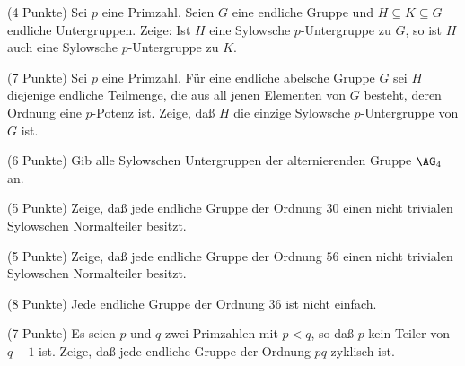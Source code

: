 \documentclass{algsheet}
\author{Dipl.-Math.~Franz Vogler}
\date{23.~Mai 2011}
\begin{document}
                \maketitle





\begin{exercise}(4 Punkte)\newline
    Sei \(p\) eine Primzahl.
    Seien \(G\) eine endliche Gruppe und \(H \subseteq K \subseteq G\) endliche
    Untergruppen. Zeige: Ist \(H\) eine Sylowsche \(p\)-Untergruppe zu \(G\), so
    ist \(H\) auch eine Sylowsche \(p\)-Untergruppe zu \(K\).
\end{exercise}

\begin{exercise}(7 Punkte)\newline
    Sei \(p\) eine Primzahl. Für eine endliche abelsche Gruppe \(G\) sei \(H\) diejenige
    endliche Teilmenge, die aus all jenen Elementen von \(G\) besteht, deren
    Ordnung eine \(p\)-Potenz ist. Zeige, daß \(H\) die einzige Sylowsche
    \(p\)-Untergruppe von \(G\) ist.
\end{exercise}

\begin{exercise}(6 Punkte)\newline
    Gib alle Sylowschen Untergruppen der alternierenden Gruppe \(\AG_4\) an.
\end{exercise}

\begin{exercise}(5 Punkte)\newline
    Zeige, daß jede endliche Gruppe der Ordnung \(30\) einen nicht trivialen
    Sylowschen Normalteiler besitzt.
\end{exercise}

\begin{exercise}(5 Punkte)\newline
    Zeige, daß jede endliche Gruppe der Ordnung \(56\) einen nicht trivialen
    Sylowschen Normalteiler besitzt.
\end{exercise}

\begin{exercise}(8 Punkte)\newline
    Jede endliche Gruppe der Ordnung \(36\) ist nicht einfach.
\end{exercise}

\begin{exercise}(7 Punkte)\newline
    Es seien \(p\) und \(q\) zwei Primzahlen mit \(p < q\), so daß \(p\) kein
    Teiler von \(q - 1\) ist. Zeige, daß jede endliche Gruppe der Ordnung \(p q\)
    zyklisch ist.
\end{exercise}
\end{document}
